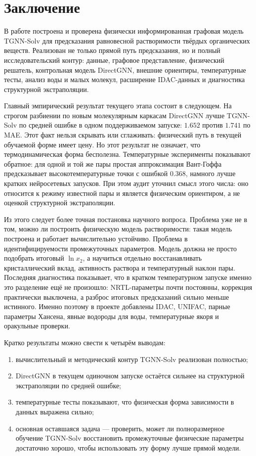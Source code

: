 \documentclass[11pt]{article}
\theoremstyle{definition}
\begin{document}
\section{Заключение}

В работе построена и проверена физически информированная графовая модель TGNN-Solv для предсказания равновесной растворимости твёрдых органических веществ. Реализован не только прямой путь предсказания, но и полный исследовательский контур: данные, графовое представление, физический решатель, контрольная модель DirectGNN, внешние ориентиры, температурные тесты, анализ воды и малых молекул, расширение IDAC-данных и диагностика структурной экстраполяции.

Главный эмпирический результат текущего этапа состоит в следующем. На строгом разбиении по новым молекулярным каркасам DirectGNN лучше TGNN-Solv по средней ошибке в одном поддерживаемом запуске: $1.652$ против $1.741$ по MAE. Этот факт нельзя скрывать или сглаживать: физический путь в текущей обучаемой форме имеет цену. Но этот результат не означает, что термодинамическая форма бесполезна. Температурные эксперименты показывают обратное: для одной и той же пары простая аппроксимация Вант-Гоффа предсказывает высокотемпературные точки с ошибкой $0.368$, намного лучше кратких нейросетевых запусков. При этом аудит уточнил смысл этого числа: оно относится к режиму известной пары и является физическим ориентиром, а не оценкой структурной экстраполяции.

Из этого следует более точная постановка научного вопроса. Проблема уже не в том, можно ли построить физическую модель растворимости: такая модель построена и работает вычислительно устойчиво. Проблема в идентифицируемости промежуточных параметров. Модель должна не просто подобрать итоговый $\ln x_2$, а научиться отдельно восстанавливать кристаллический вклад, активность раствора и температурный наклон пары. Последняя диагностика показывает, что в кратком температурном запуске именно это разделение ещё не произошло: NRTL-параметры почти постоянны, коррекция практически выключена, а разброс итоговых предсказаний сильно меньше истинного. Именно поэтому в проекте добавлены IDAC, UNIFAC, парные параметры Хансена, явные водороды для воды, температурные якоря и оракульные проверки.

Кратко результаты можно свести к четырём выводам:
\begin{enumerate}
    \item вычислительный и методический контур TGNN-Solv реализован полностью;
    \item DirectGNN в текущем одиночном запуске остаётся сильнее на структурной экстраполяции по средней ошибке;
    \item температурные тесты показывают, что физическая форма зависимости в данных выражена сильно;
    \item основная оставшаяся задача --- проверить, может ли полноразмерное обучение TGNN-Solv восстановить промежуточные физические параметры достаточно хорошо, чтобы использовать эту форму лучше прямой модели.
\end{enumerate}
\end{document}
